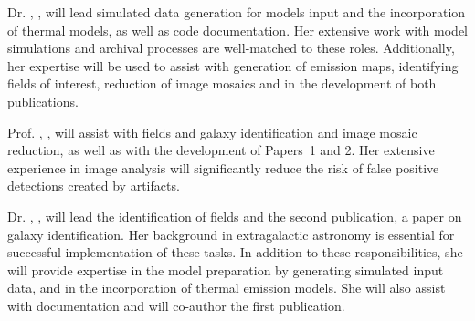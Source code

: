 Dr. , , will lead simulated data generation for models input and the incorporation of thermal models, as well as code documentation.  Her extensive work with model simulations and archival processes are well-matched to these roles.  Additionally, her expertise will be used to assist with generation of emission maps, identifying fields of interest, reduction of image mosaics and in the development of both publications. \par
Prof. , , will assist with fields and galaxy identification and image mosaic reduction, as well as with the development of Papers~1 and 2. Her extensive experience in image analysis will significantly reduce the risk of false positive detections created by artifacts. \par
Dr. , , will lead the identification of fields and the second publication, a paper on galaxy identification.  Her background in extragalactic astronomy is essential for successful implementation of these tasks. In addition to these responsibilities, she will provide expertise in the model preparation by generating simulated input data, and in the incorporation of thermal emission models.  She will also assist with documentation and will co-author the first publication. \par